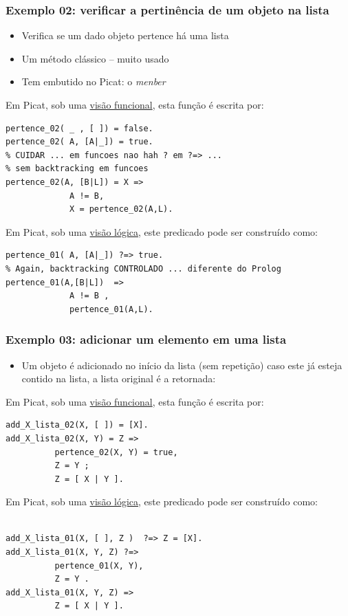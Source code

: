 \begin{frame}[fragile, allowframebreaks=0.9]
\frametitle{Exemplo 02: verificar a pertinência de um objeto na lista}

\begin{itemize}
  \item Verifica se um dado objeto pertence há uma  lista
  \item Um método clássico -- muito usado
  \item Tem embutido no Picat: o \textit{menber}
\end{itemize}

Em Picat, sob uma \underline{visão funcional}, esta função é escrita por:

 \begin{verbatim}
pertence_02( _ , [ ]) = false. 
pertence_02( A, [A|_]) = true. 
% CUIDAR ... em funcoes nao hah ? em ?=> ... 
% sem backtracking em funcoes
pertence_02(A, [B|L]) = X => 
             A != B,
             X = pertence_02(A,L).
\end{verbatim}



\framebreak
Em Picat, sob uma \underline{visão lógica}, este predicado 
pode ser construído como:
\begin{verbatim}
pertence_01( A, [A|_]) ?=> true. 
% Again, backtracking CONTROLADO ... diferente do Prolog
pertence_01(A,[B|L])  => 
             A != B ,
             pertence_01(A,L).
\end{verbatim}

\end{frame}


\begin{frame}[fragile, allowframebreaks=0.9]
\frametitle{Exemplo 03: adicionar um elemento  em uma lista}

\begin{itemize}
  \item Um objeto é adicionado no início da lista (sem repeti\c{c}ão) caso este já
 esteja contido na lista, a lista original é a retornada:
\end{itemize}

Em Picat, sob uma \underline{visão funcional}, esta função é escrita por:
 
\begin{verbatim}
add_X_lista_02(X, [ ]) = [X]. 
add_X_lista_02(X, Y) = Z =>
          pertence_02(X, Y) = true,
          Z = Y ;
          Z = [ X | Y ].
\end{verbatim}


\framebreak
Em Picat, sob uma \underline{visão lógica}, este predicado 
pode ser construído como:
\begin{verbatim}

add_X_lista_01(X, [ ], Z )  ?=> Z = [X]. 
add_X_lista_01(X, Y, Z) ?=>
          pertence_01(X, Y),
          Z = Y .
add_X_lista_01(X, Y, Z) =>
          Z = [ X | Y ].

\end{verbatim}

\end{frame}




